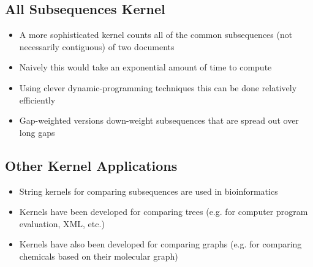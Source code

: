 \begin{slide}
\section{All Subsequences Kernel}

\begin{PauseHighLight}
  \begin{itemize}
  \item A more sophisticated kernel counts all of the common
    subsequences (not necessarily contiguous) of two documents\pause
  \item Naively this would take an exponential amount of time to
    compute\pause
  \item Using clever dynamic-programming techniques this can be done
    relatively efficiently\pause
  \item Gap-weighted versions down-weight subsequences that are spread
    out over long gaps\pause
  \end{itemize}
\end{PauseHighLight}

\end{slide}

\begin{slide}
\section{Other Kernel Applications}

\begin{PauseHighLight}
  \begin{itemize}
  \item String kernels for comparing subsequences are used in
    bioinformatics\pause
  \item Kernels have been developed for comparing trees (e.g. for
    computer program evaluation, XML, etc.)\pause
  \item Kernels have also been developed for comparing graphs (e.g. for
    comparing chemicals based on their molecular graph)\pause
  \end{itemize}
\end{PauseHighLight}

\end{slide}

